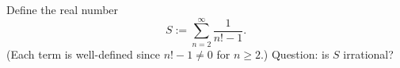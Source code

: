 Define the real number
\[
S:=\sum_{n=2}^{\infty}\frac{1}{n!-1}.
\]
(Each term is well-defined since $n!-1\neq 0$ for $n\ge 2$.)
Question: is $S$ irrational?
